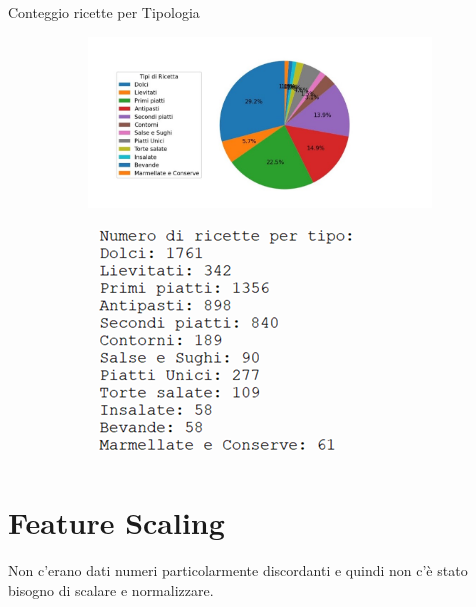\documentclass[12pt]{report}
\begin{document}
Conteggio ricette per Tipologia 

\begin{figure}[H]
  \centering
  \begin{subfigure}[b]{0.4\linewidth}
    \includegraphics[width=\linewidth]{img/img8.jpg}
  \end{subfigure}
  \begin{subfigure}[b]{0.4\linewidth}
    \includegraphics[width=\linewidth]{img/img9.jpg}
  \end{subfigure}
\end{figure}
\section{Feature Scaling}
Non c’erano dati numeri particolarmente discordanti e quindi non c’è stato bisogno di scalare e normalizzare. 
\end{document}
